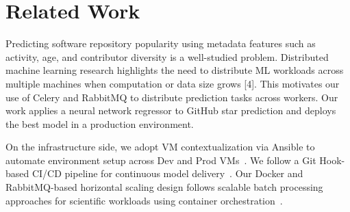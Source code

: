 \section{Related Work}

Predicting software repository popularity using metadata features such as activity, age, and contributor diversity is a well-studied problem. Distributed machine learning research highlights the need to distribute ML workloads across multiple machines when computation or data size grows [4]. This motivates our use of Celery and RabbitMQ to distribute prediction tasks across workers. Our work applies a neural network regressor to GitHub star prediction and deploys the best model in a production environment.

On the infrastructure side, we adopt VM contextualization via Ansible to automate environment setup across Dev and Prod VMs~\cite{armstrong2015}. We follow a Git Hook-based CI/CD pipeline for continuous model delivery~\cite{qian2020orchestrating}. Our Docker and RabbitMQ-based horizontal scaling design follows scalable batch processing approaches for scientific workloads using container orchestration~\cite{hariri2018}.
